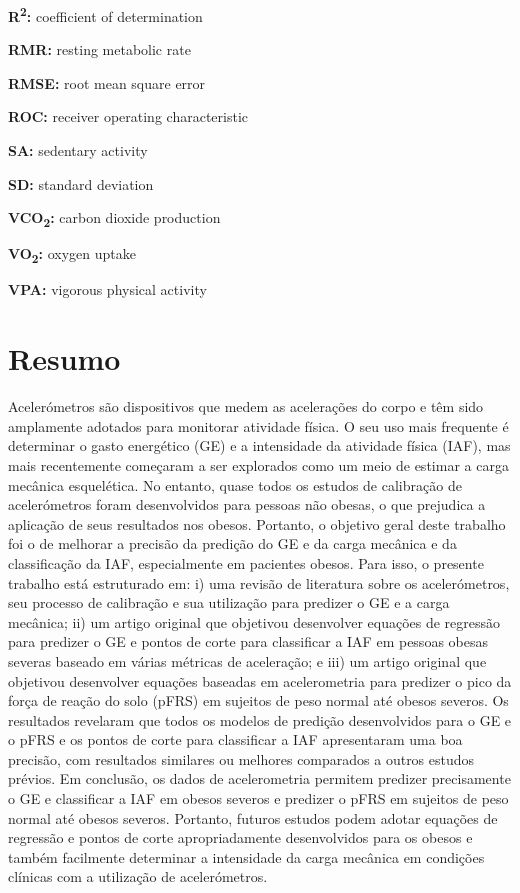 \documentclass[12pt]{article}
\begin{document}
\noindent \textbf{R\textsuperscript{2}:} coefficient of determination

\noindent \textbf{RMR:} resting metabolic rate

\noindent \textbf{RMSE:} root mean square error

\noindent \textbf{ROC:} receiver operating characteristic

\noindent \textbf{SA:} sedentary activity

\noindent \textbf{SD:} standard deviation

\noindent \textbf{VCO\textsubscript{2}:} carbon dioxide production

\noindent \textbf{VO\textsubscript{2}:} oxygen uptake

\noindent \textbf{VPA:} vigorous physical activity

\pagebreak

\section*{\hfil Resumo \hfil}
\vspace{0.5em}

\noindent Acelerómetros são dispositivos que medem as acelerações do corpo e têm sido amplamente adotados para monitorar atividade física. O seu uso mais frequente é determinar o gasto energético (GE) e a intensidade da atividade física (IAF), mas mais recentemente começaram a ser explorados como um meio de estimar a carga mecânica esquelética. No entanto, quase todos os estudos de calibração de acelerómetros foram desenvolvidos para pessoas não obesas, o que prejudica a aplicação de seus resultados nos obesos. Portanto, o objetivo geral deste trabalho foi o de melhorar a precisão da predição do GE e da carga mecânica e da classificação da IAF, especialmente em pacientes obesos. Para isso, o presente trabalho está estruturado em: i) uma revisão de literatura sobre os acelerómetros, seu processo de calibração e sua utilização para predizer o GE e a carga mecânica; ii) um artigo original que objetivou desenvolver equações de regressão para predizer o GE e pontos de corte para classificar a IAF em pessoas obesas severas baseado em várias métricas de aceleração; e iii) um artigo original que objetivou desenvolver equações baseadas em acelerometria para predizer o pico da força de reação do solo (pFRS) em sujeitos de peso normal até obesos severos. Os resultados revelaram que todos os modelos de predição desenvolvidos para o GE e o pFRS e os pontos de corte para classificar a IAF apresentaram uma boa precisão, com resultados similares ou melhores comparados a outros estudos prévios. Em conclusão, os dados de acelerometria permitem predizer precisamente o GE e classificar a IAF em obesos severos e predizer o pFRS em sujeitos de peso normal até obesos severos. Portanto, futuros estudos podem adotar equações de regressão e pontos de corte apropriadamente desenvolvidos para os obesos e também facilmente determinar a intensidade da carga mecânica em condições clínicas com a utilização de acelerómetros.
\end{document}

